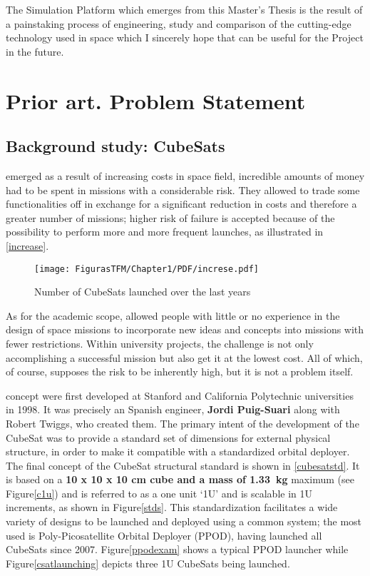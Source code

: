 The Simulation Platform which emerges from this Master's Thesis is the result of a painstaking process of engineering, study and comparison of the cutting-edge technology used in space which I sincerely hope that can be useful for the  Project in the future.


\section{Prior art. Problem Statement}\label{sec:iot}

\subsection{Background study: CubeSats} \label{cubesatdefin}

 emerged as a result of increasing costs in space field, incredible amounts of money had to be spent in missions with a considerable risk. They allowed to trade some functionalities off in exchange for a significant reduction in costs and therefore a greater number of missions; higher risk of failure is accepted because of the possibility to perform more and more frequent launches, as illustrated in \autoref{increase}.

	\begin{figure}[H]
			\centering
			\texttt{[image: FigurasTFM/Chapter1/PDF/increse.pdf]}
			\caption{Number of CubeSats launched over the last years \cite{usage}} \label{increase}
			\vspace{-1.5\baselineskip}
			\end{figure}

As for the academic scope,  allowed people with little or no experience in the design of space missions to incorporate new ideas and concepts into missions with fewer restrictions. Within university projects, the challenge is not only accomplishing a successful mission but also get it at the lowest cost. All of which, of course, supposes the risk to be inherently high, but it is not a problem itself.

 concept were first developed at Stanford and California Polytechnic universities in 1998. It was precisely an Spanish engineer, \textbf{Jordi Puig-Suari} along with Robert Twiggs, who created them. The primary intent of the development of the CubeSat was to provide a standard set of dimensions for external physical structure, in order to make it compatible with a standardized orbital deployer. The final concept of the CubeSat structural standard is shown in \autoref{cubesatstd}. It is based on a \textbf{10 x 10 x 10 cm cube and a mass of 1.33~kg} maximum (see Figure\autoref{c1u}) and is referred to as a one unit `1U' and is scalable in 1U increments, as shown in Figure\autoref{stds}. This standardization facilitates a wide variety of designs to be launched and deployed using a common system; the most used is Poly-Picosatellite Orbital Deployer (\acrshort{PPOD}), having launched all CubeSats since 2007. Figure\autoref{ppodexam} shows a typical \acrshort{PPOD} launcher while Figure\autoref{csatlaunching} depicts three 1U CubeSats being launched.




